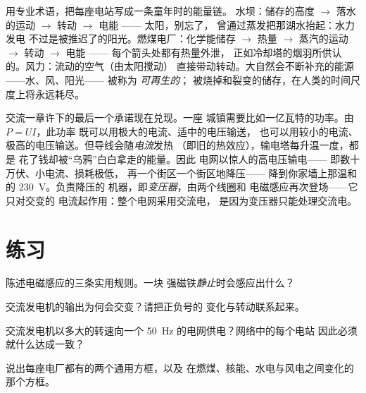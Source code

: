\begin{example}[核对后的能量链]\label{ex:g9:alternator:chains}
用专业术语，把每座电站写成一条童年时的能量链。
水坝：储存的高度 $\to$ 落水的运动
$\to$ 转动 $\to$ 电能 —— 太阳，别忘了，
曾通过蒸发把那湖水抬起：水力发电
不过是被推迟了的阳光。燃煤电厂：化学能储存
$\to$ 热量 $\to$ 蒸汽的运动 $\to$ 转动 $\to$
电能 —— 每个箭头处都有热量外泄，
正如冷却塔的烟羽所供认的。风力：流动的空气（由太阳搅动）
直接带动转动。大自然会不断补充的能源——水、风、阳光——
被称为
\emph{可再生的}；
被烧掉和裂变的储存，在人类的时间尺度上将永远耗尽。
\end{example}

\begin{remark}\label{rem:g9:alternator:transport}
交流一章许下的最后一个承诺现在兑现。一座
城镇需要比如一亿瓦特的功率。由 $P = U I$，此功率
既可以用极大的电流、适中的电压输送，
也可以用较小的电流、极高的电压输送。但导线会随\emph{电流}发热
（即旧的热效应），输电塔每升温一度，都是
花了钱却被“乌鸦”白白拿走的能量。因此
电网以惊人的高电压输电——
即数十万伏、小电流、损耗极低，
再一个街区一个街区地降压——
降到你家墙上那温和的 \qty{230}{V}。负责降压的
机器，即\emph{变压器}，由两个线圈和
电磁感应再次登场——它只对交变的
电流起作用：整个电网采用交流电，
是因为变压器只能处理交流电。
\end{remark}

\section{练习}

\begin{exercise}[$\star$]\label{exo:g9:alternator:1}
陈述电磁感应的三条实用规则。一块
强磁铁\emph{静止}时会感应出什么？
\end{exercise}

\begin{exercise}[$\star$]\label{exo:g9:alternator:2}
交流发电机的输出为何会交变？请把正负号的
变化与转动联系起来。
\end{exercise}

\begin{exercise}[$\star$]\label{exo:g9:alternator:3}
交流发电机以多大的转速向一个
\qty{50}{Hz} 的电网供电？网络中的每个电站
因此必须就什么达成一致？
\end{exercise}

\begin{exercise}[$\star$]\label{exo:g9:alternator:4}
说出每座电厂都有的两个通用方框，以及
在燃煤、核能、水电与风电之间变化的那个方框。
\end{exercise}

